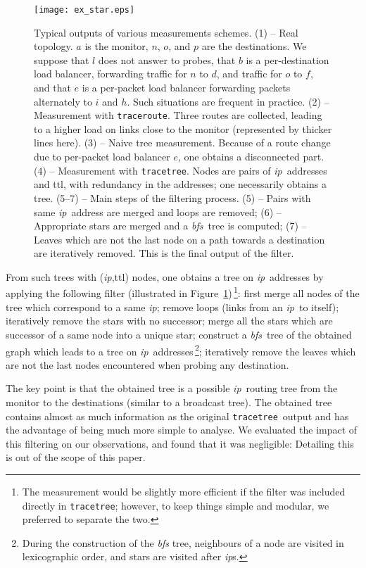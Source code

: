 \documentclass[times, 10pt,twocolumn]{article}
\newcommand{\traceroute}{{\tt trace\-route}}
\newcommand{\tracetree}{{\tt trace\-tree}}
\newcommand{\ip}{\mbox{\em \sc ip}}
\newcommand{\bfs}{{\em \sc bfs}}
\newcommand{\ttl}{\mbox{\sc ttl}}
\begin{document}
 
\begin{figure}[!h]
\centering
\texttt{[image: ex\_star.eps]}
\caption{Typical outputs of various measurements schemes.
(1) -- Real topology. $a$ is the monitor, $n$, $o$, and $p$ are the destinations.
We suppose that $l$ does not answer to probes, that $b$ is a per-destination load balancer,
forwarding traffic for $n$ to $d$,
and traffic for $o$ to $f$, and that $e$ is a per-packet load balancer forwarding packets alternately to $i$ and $h$. Such situations are frequent in practice.
(2) -- Measurement with \traceroute. Three routes are collected, leading to a higher load on links close to the monitor (represented by thicker lines here).
(3) -- Naive tree measurement. Because of a route change due to per-packet load balancer $e$, one obtains a disconnected part.
(4) -- Measurement with \tracetree. Nodes are pairs of \ip\ addresses and \ttl, with redundancy in the addresses;
one necessarily obtains a tree.
(5--7) -- Main steps of the filtering process.
(5) -- Pairs with same \ip\ address are merged and loops are removed;
(6) -- Appropriate stars are merged and a \bfs\ tree is computed;
(7) -- Leaves which are not the last node on a path towards a destination are iteratively removed.
This is the final output of the filter.
}
\label{fig_ex}
\end{figure}

From such trees with (\ip,\ttl) nodes, one obtains a tree on \ip\ addresses by applying the following filter (illustrated in Figure~\ref{fig_ex})\,\footnote{The measurement would be slightly more efficient if the filter was included directly in \tracetree; however, to keep things simple and modular, we preferred to separate the two.}:
first merge all nodes of the tree which correspond to a same \ip;
remove loops (links from an \ip\ to itself); iteratively remove the stars with no successor;
merge all the stars which are successor of a same node into a unique star;
construct a \bfs\ tree of the obtained graph which leads to a tree on \ip\ addresses\,\footnote{During the construction
of the \bfs{} tree, neighbours of a node are visited in lexicographic order, and stars 
are visited after \ip{}s.};
iteratively remove the leaves which are not the last nodes encountered when probing any destination.

The key point is that the obtained tree is a possible \ip\ routing
tree from the monitor to the destinations (similar to a broadcast
tree).
The obtained tree contains almost as much information as the original
\tracetree\ output and has the advantage of being much more simple to
analyse.
We evaluated the impact of this filtering on our observations,
and found that it was negligible:
Detailing this is out of the scope of this paper.
\end{document}
